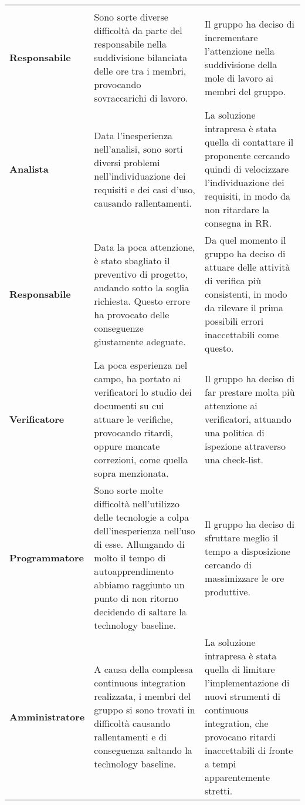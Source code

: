 \documentclass[../piano-di-qualifica.tex]{subfiles}
\begin{document}
  \begin{longtable}[H]{>{\centering\bfseries}m{4cm} >{\centering\arraybackslash}m{6cm} >{\centering\arraybackslash}m{6cm}}
    \rowcolor{darkgray!90!}
    \color{white}{\textbf{Ruolo}} & \color{white}{\textbf{Problema}} & \color{white}{\textbf{Soluzione}} \\
    Responsabile & Sono sorte diverse difficoltà da parte del responsabile nella suddivisione bilanciata delle ore tra i membri, provocando sovraccarichi di lavoro. & Il gruppo ha deciso di incrementare l'attenzione nella suddivisione della mole di lavoro ai membri del gruppo. \\
    Analista & Data l'inesperienza nell'analisi, sono sorti diversi problemi nell'individuazione dei requisiti e dei casi d'uso, causando rallentamenti. & La soluzione intrapresa è stata quella di contattare il proponente cercando quindi di velocizzare l'individuazione dei requisiti, in modo da non ritardare la consegna in RR\@. \\
    Responsabile & Data la poca attenzione, è stato sbagliato il preventivo di progetto, andando sotto la soglia richiesta. Questo errore ha provocato delle conseguenze giustamente adeguate. & Da quel momento il gruppo ha deciso di attuare delle attività di verifica più consistenti, in modo da rilevare il prima possibili errori inaccettabili come questo. \\
    Verificatore & La poca esperienza nel campo, ha portato ai verificatori lo studio dei documenti su cui attuare le verifiche, provocando ritardi, oppure mancate correzioni, come quella sopra menzionata. & Il gruppo ha deciso di far prestare molta più attenzione ai verificatori, attuando una politica di ispezione attraverso una check-list. \\
    Programmatore & Sono sorte molte difficoltà nell'utilizzo delle tecnologie a colpa dell'inesperienza nell'uso di esse. Allungando di molto il tempo di autoapprendimento abbiamo raggiunto un punto di non ritorno decidendo di saltare la technology baseline. & Il gruppo ha deciso di sfruttare meglio il tempo a disposizione cercando di massimizzare le ore produttive. \\
    Amministratore & A causa della complessa continuous integration realizzata, i membri del gruppo si sono trovati in difficoltà causando rallentamenti e di conseguenza saltando la technology baseline. & La soluzione intrapresa è stata quella di limitare l'implementazione di nuovi strumenti di continuous integration, che provocano ritardi inaccettabili di fronte a tempi apparentemente stretti. \\
  \end{longtable}
\end{document}
